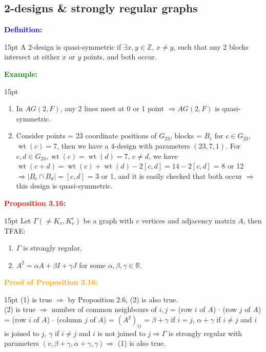 \documentclass[12pt]{article}
\newcommand{\noparskip}{\vspace{-\parskip}}
\newenvironment{points}
	{\begin{enumerate}[label = (\arabic*)]}
	{\end{enumerate}}
\newenvironment{dent}
	{\begin{adjustwidth}{15pt}{}\noparskip}
	{\end{adjustwidth}}
\newenvironment{result}[1]
	{\textcolor{Red}{\textbf{#1:}}\begin{dent}}
	{\end{dent}}
\newenvironment{proof}[1]
	{\textcolor{Orange}{\textbf{Proof of #1:}}\begin{dent}}
	{\end{dent}}
\newenvironment{definition}
	{\textcolor{Blue}{\textbf{Definition:}}\begin{dent}}
	{\end{dent}}
\newenvironment{example}
	{\textcolor{Green}{\textbf{Example:}}\begin{dent}}
	{\end{dent}}
\renewcommand{\implies}{\Rightarrow}
\newcommand{\sizeof}[1]{\left| #1 \right|}
\newcommand{\Z}{\mathbb{Z}}
\newcommand{\R}{\mathbb{R}}
\newcommand{\wt}[1]{\operatorname{wt}(#1)}
\begin{document}
\subsection{2-designs \& strongly regular graphs}

\begin{definition}
A 2-design is quasi-symmetric if $\exists x, y \in \Z$, $x \ne y$, such that any 2 blocks intersect at either $x$ or $y$ points, and both occur.
\end{definition}

\begin{example}
\begin{points}
\item In $AG(2, F)$, any 2 lines meet at 0 or 1 point $\implies AG(2, F)$ is quasi-symmetric.
\item Consider points = 23 coordinate positions of $G_{23}$, blocks = $B_c$ for $c \in G_{23}$, $\wt{c} = 7$, then we have a 4-design with parameters $(23, 7, 1)$. For $c, d \in G_{23}, \wt{c} = \wt{d} = 7$, $c \ne d$, we have $\wt{c + d} = \wt{c} + \wt{d} - 2[c, d] = 14 - 2[c, d]$ = 8 or 12 $\implies \sizeof{B_c \cap B_d} = [c, d]$ = 3 or 1, and it is easily checked that both occur $\implies$ this design is quasi-symmetric.
\end{points}
\end{example}

\begin{result}{Proposition 3.16}
Let $\Gamma (\ne K_v, K_v^c)$ be a graph with $v$ vertices and adjacency matrix $A$, then TFAE:
\noparskip
\begin{points}
\item $\Gamma$ is strongly regular,
\item $A^2 = \alpha A + \beta I + \gamma J$ for some $\alpha, \beta, \gamma \in \R$.
\end{points}
\end{result}

\begin{proof}{Proposition 3.16}
(1) is true $\implies$ by Proposition 2.6, (2) is also true. \\
(2) is true $\implies$ number of common neighbours of $i, j$ = (row $i$ of $A$) $\cdot$ (row $j$ of $A$) = (row $i$ of $A$) $\cdot$ (column $j$ of $A$) = $(A^2)_{ij}$ = $\beta + \gamma$ if $i = j$, $\alpha + \gamma$ if $i \ne j$ and $i$ is joined to $j$, $\gamma$ if $i \ne j$ and $i$ is not joined to $j \implies \Gamma$ is strongly regular with parameters $(v, \beta + \gamma, \alpha + \gamma, \gamma) \implies$ (1) is also true.
\end{proof}
\end{document}
